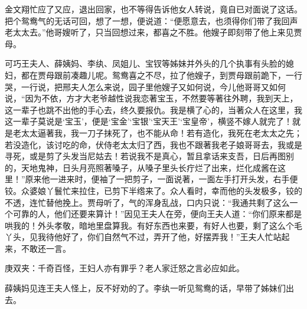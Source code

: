 \begin{parag}
    金文翔忙应了又应，退出回家，也不等得告诉他女人转说，竟自已对面说了这话。把个鸳鸯气的无话可回，想了一想，便说道：“便愿意去，也须得你们带了我回声老太太去。”他哥嫂听了，只当回想过来，都喜之不胜。他嫂子即刻带了他上来见贾母。
\end{parag}


\begin{parag}
    可巧王夫人、薛姨妈、李纨、凤姐儿、宝钗等姊妹并外头的几个执事有头脸的媳妇，都在贾母跟前凑趣儿呢。鸳鸯喜之不尽，拉了他嫂子，到贾母跟前跪下，一行哭，一行说，把邢夫人怎么来说，园子里他嫂子又如何说，今儿他哥哥又如何说，“因为不依，方才大老爷越性说我恋著宝玉，不然要等著往外聘，我到天上，这一辈子也跳不出他的手心去，终久要报仇。我是横了心的，当著众人在这里，我这一辈子莫说是‘宝玉’，便是‘宝金’‘宝银’‘宝天王’‘宝皇帝’，横竖不嫁人就完了！就是老太太逼著我，我一刀子抹死了，也不能从命！若有造化，我死在老太太之先；若没造化，该讨吃的命，伏侍老太太归了西，我也不跟著我老子娘哥哥去，我或是寻死，或是剪了头发当尼姑去！若说我不是真心，暂且拿话来支吾，日后再图别的，天地鬼神，日头月亮照著嗓子，从嗓子里头长疔烂了出来，烂化成酱在这里！”原来他一进来时，便袖了一把剪子，一面说著，一面左手打开头发，右手便铰。众婆娘丫鬟忙来拉住，已剪下半绺来了。众人看时，幸而他的头发极多，铰的不透，连忙替他挽上。贾母听了，气的浑身乱战，口内只说：“我通共剩了这么一个可靠的人，他们还要来算计！”因见王夫人在旁，便向王夫人道：“你们原来都是哄我的！外头孝敬，暗地里盘算我。有好东西也来要，有好人也要，剩了这么个毛丫头，见我待他好了，你们自然气不过，弄开了他，好摆弄我！”王夫人忙站起来，不敢还一言。\begin{note}庚双夹：千奇百怪，王妇人亦有罪乎？老人家迁怒之言必应如此。\end{note}薛姨妈见连王夫人怪上，反不好劝的了。李纨一听见鸳鸯的话，早带了姊妹们出去。
\end{parag}


